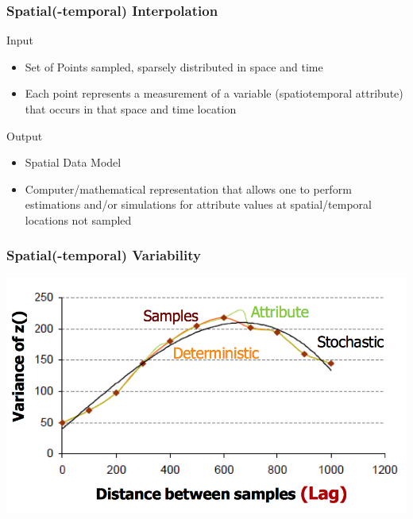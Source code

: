 \documentclass{beamer}
\begin{document}
\begin{frame}
\frametitle{Spatial(-temporal) Interpolation}
\begin{block}{Input}
\begin{itemize}
\item  Set of Points sampled, sparsely distributed in space and time
\item  Each point represents a measurement of a variable (spatiotemporal attribute) that occurs in that space and time location
\end{itemize}
\end{block}
\vspace{1 cm}
\pause
\begin{block}{Output}
\begin{itemize}
\item \alert{Spatial Data Model}
\item Computer/mathematical representation that allows one to perform estimations and/or simulations for attribute values at spatial/temporal locations not sampled
\end{itemize}
\end{block}
\end{frame}


\begin{frame}
\frametitle{Spatial(-temporal) Variability}
\centering
\includegraphics[width=\textwidth]{Figures/vario.png}
\end{frame}

\end{document}

